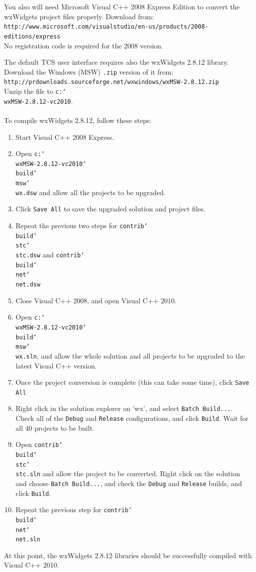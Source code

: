 \documentclass{article}
\newcommand\bslash{\char`\\}
\begin{document}
You also will need Microsoft Visual C++ 2008 Express Edition to convert the wxWidgets project files properly.  Download from:\\
\texttt{http://www.microsoft.com/visualstudio/en-us/products/2008-editions/express}\\No registration code is required for the 2008 version.

The default TCS user interface requires also the wxWidgets 2.8.12 library.  Download the Windows (MSW) \texttt{.zip} version of it from:\\ \texttt{http://prdownloads.sourceforge.net/wxwindows/wxMSW-2.8.12.zip}\\
Unzip the file to \texttt{c:\bslash wxMSW-2.8.12-vc2010}.
\\\\
To compile wxWidgets 2.8.12, follow these steps:
\begin{enumerate}
\item Start Visual C++ 2008 Express.
\item Open \texttt{c:\bslash wxMSW-2.8.12-vc2010\bslash build\bslash msw\bslash wx.dsw} and allow all the projects to be upgraded.
\item Click \texttt{Save All} to save the upgraded solution and project files.
\item Repeat the previous two steps for \texttt{contrib\bslash build\bslash stc\bslash stc.dsw} and \texttt{contrib\bslash build\bslash net\bslash net.dsw}
\item Close Visual C++ 2008, and open Visual C++ 2010.
\item Open \texttt{c:\bslash wxMSW-2.8.12-vc2010\bslash build\bslash msw\bslash wx.sln}, and allow the whole solution and all projects to be upgraded to the latest Visual C++ version.
\item Once the project conversion is complete (this can take some time), click \texttt{Save All}
\item Right click in the solution explorer on 'wx', and select \texttt{Batch Build...}.  Check all of the \texttt{Debug} and \texttt{Release} configurations, and click \texttt{Build}.  Wait for all 40 projects to be built.
\item Open \texttt{contrib\bslash build\bslash stc\bslash stc.sln} and allow the project to be converted.  Right click on the solution and choose \texttt{Batch Build...}, and check the \texttt{Debug} and \texttt{Release} builds, and click \texttt{Build}.
\item Repeat the previous step for  \texttt{contrib\bslash build\bslash net\bslash net.sln}
\end{enumerate}
At this point, the wxWidgets 2.8.12 libraries should be successfully compiled with Visual C++ 2010.
\end{document}
